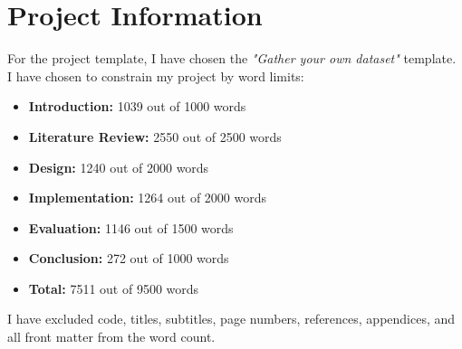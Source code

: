 
{}

\vspace*{3cm}

\begingroup
\chapter*{Project Information}

For the project template, I have chosen the \emph{"Gather your own dataset"} template. 
I have chosen to constrain my project by word limits:

\begin{itemize}
    \item \textbf{Introduction:} 1039 out of 1000 words
    \item \textbf{Literature Review:} 2550 out of 2500 words
    \item \textbf{Design:} 1240 out of 2000 words
    \item \textbf{Implementation:} 1264 out of 2000 words
    \item \textbf{Evaluation:} 1146 out of 1500 words
    \item \textbf{Conclusion:} 272 out of 1000 words
    \item \textbf{Total:} 7511 out of 9500 words
\end{itemize}

I have excluded code, titles, subtitles, page numbers, references, appendices, and all front matter from the word count.


\endgroup

